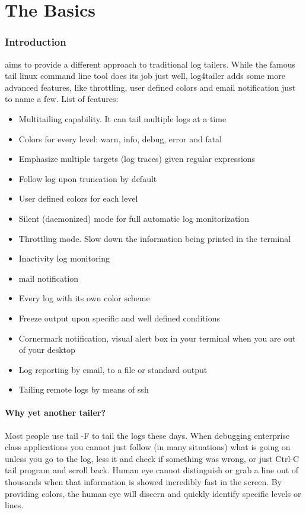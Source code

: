 \pagestyle{fancy}
\part{The Basics}
\section{Introduction}
\logftailer{} aims to provide a different approach to traditional log tailers.
While the famous tail linux
command line tool does its job just well, log4tailer adds
some more advanced features, like throttling, user defined colors and email notification just 
to name a few. 
List of features:

\begin{itemize}
 \item Multitailing capability. It can tail multiple logs at a time
 \item Colors for every level: warn, info, debug, error and fatal
 \item Emphasize multiple targets (log traces) given regular expressions
 \item Follow log upon truncation by default
 \item User defined colors for each level
 \item Silent (daemonized) mode for full automatic log monitorization
 \item Throttling mode. Slow down the information being printed in the terminal 
 \item Inactivity log monitoring
 \item mail notification
 \item Every log with its own color scheme
 \item Freeze output upon specific and well defined conditions
 \item Cornermark notification, visual alert box in your terminal when you are out of your desktop
 \item Log reporting by email, to a file or standard output
 \item Tailing remote logs by means of ssh
 
\end{itemize}

\subsection{Why yet another tailer?}

Most people use tail -F to tail the logs these days. When debugging enterprise
class applications you cannot just follow (in many situations) what is going on
unless you go to the log, less it and check if something was wrong, or just
Ctrl-C tail program and scroll back. Human eye cannot distinguish or grab a line
out of thousands when that information is showed incredibly fast in the screen.
By providing colors, the human eye will discern and quickly identify specific
levels or lines. 

